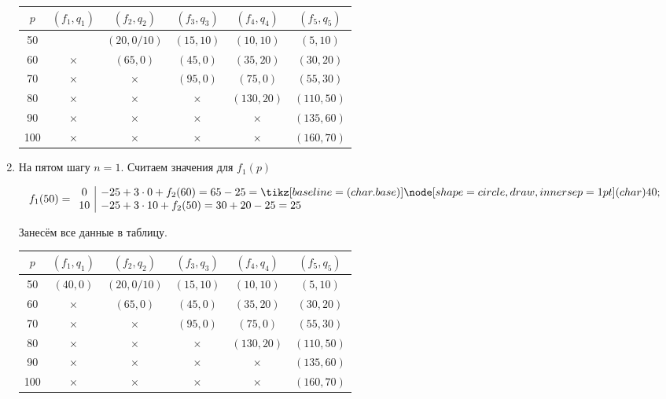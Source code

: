\begin{enumerate}
	\begin{table}[H]
		\centering
		\begin{tabular}{ | c | c | c | c | c | c | } 
			\hline
			$p$ & $(f_1, q_1)$ & $(f_2, q_2)$ & $(f_3, q_3)$ & $(f_4, q_4)$ & $(f_5, q_5)$ \\ 
			\hline
			50 & & $(20, 0/10)$ & $(15, 10)$ & $(10, 10)$ & $(5, 10)$ \\\hline
			60 & $\times$ & $(65, 0)$ & $(45, 0)$ & $(35, 20)$ & $(30, 20)$ \\\hline
			70 & $\times$ & $\times$ & $(95, 0)$ & $(75, 0)$ & $(55, 30)$ \\\hline
			80 & $\times$ & $\times$ & $\times$ & $(130, 20)$ & $(110, 50)$ \\\hline
			90 & $\times$ & $\times$ & $\times$ & $\times$ & $(135, 60)$ \\\hline
			100 & $\times$ & $\times$ & $\times$ & $\times$ & $(160, 70)$ \\\hline
		\end{tabular}
	\end{table}
	
		\item[\fbox{\textbf{Шаг 5}}] На пятом шагу $n = 1$. Считаем значения для $f_1(p)$
	
	\[
	f_1(50) = \begin{array}{c|l}
		0 & -25 + 3 \cdot 0 + f_2(60) = 65 - 25 = \circled{40} \\
		10 & -25 + 3 \cdot 10 + f_2(50) = 30 + 20 - 25 = 25 \\
	\end{array}
	\]
	
	Занесём все данные в таблицу.
	
	\begin{table}[H]
		\centering
		\begin{tabular}{ | c | c | c | c | c | c | } 
			\hline
			$p$ & $(f_1, q_1)$ & $(f_2, q_2)$ & $(f_3, q_3)$ & $(f_4, q_4)$ & $(f_5, q_5)$ \\ 
			\hline
			50 & $(40, 0)$ & $(20, 0/10)$ & $(15, 10)$ & $(10, 10)$ & $(5, 10)$ \\\hline
			60 & $\times$ & $(65, 0)$ & $(45, 0)$ & $(35, 20)$ & $(30, 20)$ \\\hline
			70 & $\times$ & $\times$ & $(95, 0)$ & $(75, 0)$ & $(55, 30)$ \\\hline
			80 & $\times$ & $\times$ & $\times$ & $(130, 20)$ & $(110, 50)$ \\\hline
			90 & $\times$ & $\times$ & $\times$ & $\times$ & $(135, 60)$ \\\hline
			100 & $\times$ & $\times$ & $\times$ & $\times$ & $(160, 70)$ \\\hline
		\end{tabular}
	\end{table}
	

\end{enumerate}
